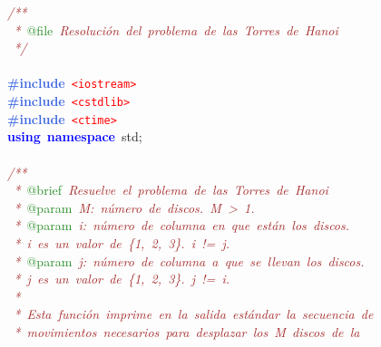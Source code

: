 \noindent
\mbox{}\textit{\textcolor{Brown}{/**}} \\
\mbox{}\textit{\textcolor{Brown}{\ *\ }}\textcolor{ForestGreen}{@file}\textit{\textcolor{Brown}{\ Resolución\ del\ problema\ de\ las\ Torres\ de\ Hanoi}} \\
\mbox{}\textit{\textcolor{Brown}{\ */}} \\
\mbox{} \\
\mbox{}\textbf{\textcolor{RoyalBlue}{\#include}}\ \texttt{\textcolor{Red}{\textless{}iostream\textgreater{}}} \\
\mbox{}\textbf{\textcolor{RoyalBlue}{\#include}}\ \texttt{\textcolor{Red}{\textless{}cstdlib\textgreater{}}} \\
\mbox{}\textbf{\textcolor{RoyalBlue}{\#include}}\ \texttt{\textcolor{Red}{\textless{}ctime\textgreater{}}} \\
\mbox{}\textbf{\textcolor{Blue}{using}}\ \textbf{\textcolor{Blue}{namespace}}\ std\textcolor{BrickRed}{;} \\
\mbox{} \\
\mbox{}\textit{\textcolor{Brown}{/**}} \\
\mbox{}\textit{\textcolor{Brown}{\ *\ }}\textcolor{ForestGreen}{@brief}\textit{\textcolor{Brown}{\ Resuelve\ el\ problema\ de\ las\ Torres\ de\ Hanoi}} \\
\mbox{}\textit{\textcolor{Brown}{\ *\ }}\textcolor{ForestGreen}{@param}\textit{\textcolor{Brown}{\ M:\ número\ de\ discos.\ M\ \textgreater{}\ 1.}} \\
\mbox{}\textit{\textcolor{Brown}{\ *\ }}\textcolor{ForestGreen}{@param}\textit{\textcolor{Brown}{\ i:\ número\ de\ columna\ en\ que\ están\ los\ discos.}} \\
\mbox{}\textit{\textcolor{Brown}{\ *\ i\ es\ un\ valor\ de\ \{1,\ 2,\ 3\}.\ i\ !=\ j.}} \\
\mbox{}\textit{\textcolor{Brown}{\ *\ }}\textcolor{ForestGreen}{@param}\textit{\textcolor{Brown}{\ j:\ número\ de\ columna\ a\ que\ se\ llevan\ los\ discos.}} \\
\mbox{}\textit{\textcolor{Brown}{\ *\ j\ es\ un\ valor\ de\ \{1,\ 2,\ 3\}.\ j\ !=\ i.}} \\
\mbox{}\textit{\textcolor{Brown}{\ *\ }} \\
\mbox{}\textit{\textcolor{Brown}{\ *\ Esta\ función\ imprime\ en\ la\ salida\ estándar\ la\ secuencia\ de}} \\
\mbox{}\textit{\textcolor{Brown}{\ *\ movimientos\ necesarios\ para\ desplazar\ los\ M\ discos\ de\ la}} \\
